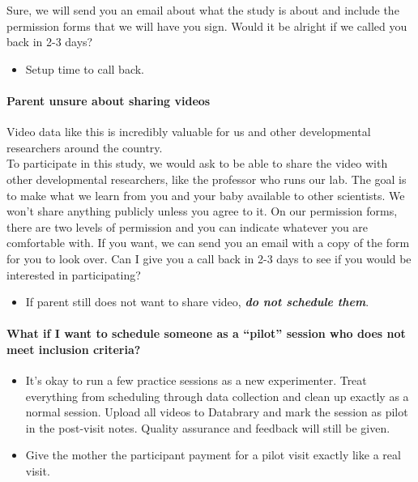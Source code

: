 \documentclass[
  12pt,
]{book}
\providecommand{\tightlist}{%
  \setlength{\itemsep}{0pt}\setlength{\parskip}{0pt}}
\begin{document}
Sure, we will send you an email about what the study is about and include the permission forms that we will have you sign. Would it be alright if we called you back in 2-3 days?

\begin{itemize}
\tightlist
\item
  Setup time to call back.
\end{itemize}

\hypertarget{parent-unsure-about-sharing-videos}{%
\paragraph*{Parent unsure about sharing videos}\label{parent-unsure-about-sharing-videos}}

Video data like this is incredibly valuable for us and other developmental researchers around the country.\\
To participate in this study, we would ask to be able to share the video with other developmental researchers, like the professor who runs our lab. The goal is to make what we learn from you and your baby available to other scientists. We won't share anything publicly unless you agree to it. On our permission forms, there are two levels of permission and you can indicate whatever you are comfortable with. If you want, we can send you an email with a copy of the form for you to look over. Can I give you a call back in 2-3 days to see if you would be interested in participating?

\begin{itemize}
\tightlist
\item
  If parent still does not want to share video, \emph{\textbf{do not schedule them}}.
\end{itemize}

\hypertarget{what-if-i-want-to-schedule-someone-as-a-pilot-session-who-does-not-meet-inclusion-criteria}{%
\paragraph*{What if I want to schedule someone as a ``pilot'' session who does not meet inclusion criteria?}\label{what-if-i-want-to-schedule-someone-as-a-pilot-session-who-does-not-meet-inclusion-criteria}}

\begin{itemize}
\tightlist
\item
  It's okay to run a few practice sessions as a new experimenter. Treat everything from scheduling through data collection and clean up exactly as a normal session. Upload all videos to Databrary and mark the session as pilot in the post-visit notes. Quality assurance and feedback will still be given.
\item
  Give the mother the participant payment for a pilot visit exactly like a real visit.
\end{itemize}
\end{document}
